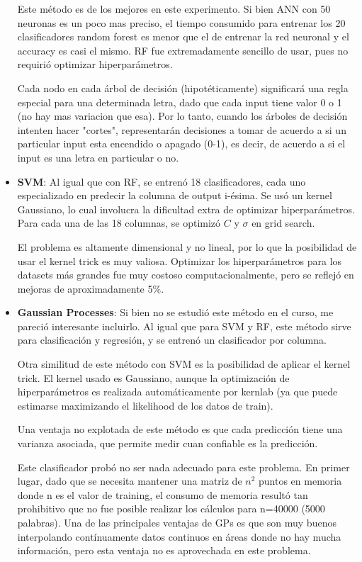 \documentclass[paper=a4, fontsize=11pt]{scrartcl} %
\numberwithin{equation}{section} %
\numberwithin{figure}{section} %
\numberwithin{table}{section} %
\begin{document}
\begin{itemize}
Este método es de los mejores en este experimento. Si bien ANN con 50 neuronas es un poco mas preciso, el tiempo consumido para entrenar los 20 clasificadores random forest es menor que el de entrenar la red neuronal y el accuracy es casi el mismo.  RF fue extremadamente sencillo de usar, pues no requirió optimizar hiperparámetros.

Cada nodo en cada árbol de decisión (hipotéticamente) significará una regla especial para una determinada letra, dado que cada input tiene valor 0 o 1 (no hay mas variacion que esa). Por lo tanto, cuando los árboles de decisión intenten hacer "cortes", representarán decisiones a tomar de acuerdo a si un particular input esta encendido o apagado (0-1), es decir, de acuerdo a si el input es una letra en particular o no.

\item \textbf{SVM}: Al igual que con RF, se entrenó 18 clasificadores, cada uno especializado en predecir la columna de output i-ésima. Se usó un kernel Gaussiano, lo cual involucra la dificultad extra de optimizar hiperparámetros. Para cada una de las 18 columnas, se optimizó $C$ y $\sigma$ en grid search.

El problema es altamente dimensional y no lineal, por lo que la posibilidad de usar el kernel trick es muy valiosa. Optimizar los hiperparámetros para los datasets más grandes fue muy costoso computacionalmente, pero se reflejó en mejoras de aproximadamente 5\%.

\item \textbf{Gaussian Processes}: Si bien no se estudió este método en el curso, me pareció interesante incluirlo\cite{gauss_processes}. Al igual que para SVM y RF, este método sirve para clasificación y regresión, y se entrenó un clasificador por columna. 

Otra similitud de este método con SVM es la posibilidad de aplicar el kernel trick. El kernel usado es Gaussiano, aunque la optimización de hiperparámetros es realizada automáticamente por kernlab (ya que puede estimarse maximizando el likelihood de los datos de train).

Una ventaja no explotada de este método es que cada predicción tiene una varianza asociada, que permite medir cuan confiable es la predicción.

Este clasificador probó no ser nada adecuado para este problema. En primer lugar, dado que se necesita mantener una matriz de $n^2$ puntos en memoria donde n es el valor de training, el consumo de memoria resultó tan prohibitivo que no fue posible realizar los cálculos para n=40000 (5000 palabras). Una de las principales ventajas de GPs es que son muy buenos interpolando contínuamente datos continuos en áreas donde no hay mucha información, pero esta ventaja no es aprovechada en este problema.


\end{itemize}
\end{document}
